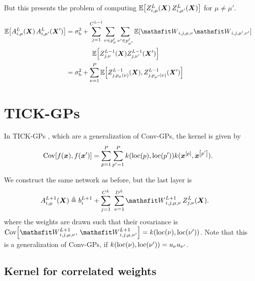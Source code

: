 \documentclass{article} %
\newcommand{\bracket}[3]{{\left#1 #3 \right#2}}
\newcommand{\bra}{\bracket{(}{)}}
\newcommand{\sqb}{\bracket{[}{]}}
\newcommand{\ssup}[1]{^{#1}}
\newcommand{\eqdef}{\triangleq}
\newcommand{\patch}[2]{{p\ssup{#1}_{#2}}}
\begin{document}
But this presents the problem of computing
$\E\sqb{\emZ\ssup{L}_{i,\mu}(\mX)\, \emZ\ssup{L}_{i,\mu'}(\mX)}$ for $\mu\neq
\mu'$.

\begin{equation}
\begin{aligned}
  \E\sqb{\emA\ssup{L}_{i,\mu}(\mX)\, \emA\ssup{L}_{i,\mu'}(\mX')} &= \sigma_\text{b}^2
  + \sum_{j=1}^{C\ssup{L-1}} \sum_{\nu\in \patch{\ell}{\mu}}\sum_{\nu'\in \patch{\ell}{\mu'}} \E\sqb{\etW_{i,j,\mu,\nu} \etW_{i,j,\mu',\nu'}}\\
  &\hspace{4em}\E\sqb{Z\ssup{L-1}_{j,\nu}(\mX)Z\ssup{L-1}_{j,\nu'}(\mX')} \\
  &= \sigma_\text{b}^2 + \sum_{\nu=1}^P \E\sqb{Z\ssup{L-1}_{j,p_\mu(\nu)}(\mX), Z\ssup{L-1}_{j,p_{\mu'}(\nu)}(\mX')}
\end{aligned}
\end{equation}


\section{TICK-GPs}
In TICK-GPs \citep{dutordoir2019tick}, which are a generalization of Conv-GPs, the kernel is given by
\begin{equation}
\Cov\sqb{f(\vx), f(\vx')} = \sum_{p=1}^P\sum_{p'=1}^P k\bra{\text{loc}\bra{p}, \text{loc}\bra{p'}} k(\vx^\sqb{p}, \vx^\sqb{p'}).
\end{equation}

We construct the same network as before, but the last layer is
\begin{align}
\emA_{i,\mu}\ssup{L+1}(\mX) &\eqdef \evb_i\ssup{L+1} +
\sum_{j=1}^{C\ssup{L}} \ \sum_{\nu=1}^{D\ssup{L}} \etW\ssup{L+1}_{i,j,\mu,\nu}\, \emZ\ssup{L}_{j,\nu}(\mX).
\label{eq:tickgp-network-final}
\end{align}
where the weights are drawn such that their covariance is
$\Cov\sqb{\etW\ssup{L+1}_{i,j,\mu,\nu},\, \etW\ssup{L+1}_{i,j,\mu,\nu'}} =
k(\text{loc}(\nu), \text{loc}(\nu'))$. Note that this is a generalization of
Conv-GPs, if $k(\text{loc}(\nu), \text{loc}(\nu')) = {u}_\nu {u}_{\nu'}$.

\subsection{Kernel for correlated weights}
\end{document}
